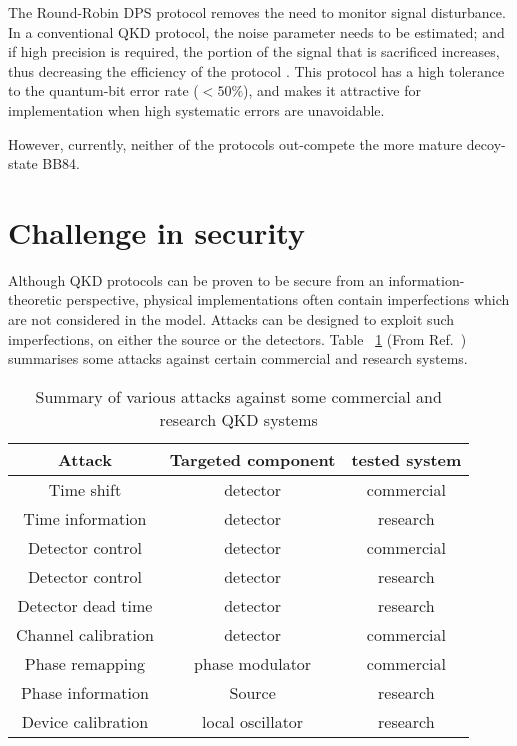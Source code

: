 \documentclass[reprint,
superscriptaddress,
 amsmath,amssymb,
 aps,
prb,
]{revtex4-1}
\begin{document}
The Round-Robin DPS protocol\cite{sasaki2014practical} removes the need to monitor signal disturbance. In a conventional QKD protocol, the noise parameter needs to
be estimated; and if high precision is required, the portion of the signal that is sacrificed increases, thus decreasing the efficiency of the protocol \cite{cai2009finite,hayashi2014security}. This protocol has a high tolerance to
the quantum-bit error rate ($< 50\%$)\cite{xu2015discrete}, and makes it attractive for implementation when high systematic errors are unavoidable.   

However, currently, neither of the protocols out-compete the more mature decoy-state BB84.

\section{Challenge in security}
Although QKD protocols can be proven to be secure from an information-theoretic perspective, physical implementations often contain imperfections which are not considered in the model. Attacks can be designed to exploit such imperfections, on either the source or the detectors.
% 
Table ~\ref{attacks} (From Ref.~\cite{lo2014secure}) summarises some attacks against certain commercial and research systems.

\begin{table}
\begin{tabular}{ |c|c|c| } 
 \hline
 Attack &  Targeted component & tested system\\ 
  \hline
Time shift\cite{qi2005time,PhysRevA.78.042333,PhysRevA.74.022313}
        & detector & commercial \\
Time information\cite{lamas2007breaking}  & detector & research \\
Detector control \cite{lydersen2010hacking,yuan2010avoiding}  & detector  &   commercial \\
Detector control \cite{gerhardt2011full}    & detector  & research  \\
Detector dead time\cite{weier2011quantum}     & detector  & research         \\
Channel calibration\cite{jain2011device}    & detector  &  commercial        \\
Phase remapping\cite{xu2010experimental} &  phase modulator & commercial \\
Phase information\cite{tang2013source} & Source & research           \\
Device calibration\cite{jouguet2013preventing} & local oscillator & research \\
                \hline
\end{tabular}
\caption{\label{attacks} Summary of various attacks against some commercial and 
research QKD systems}
\end{table}
\end{document}
